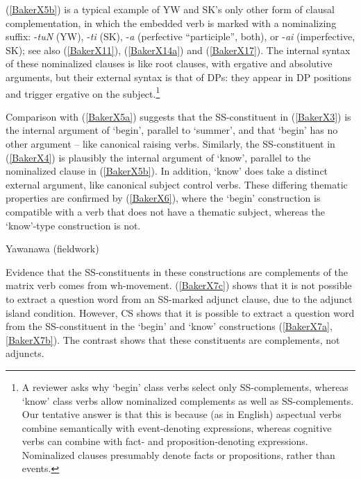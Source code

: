 \documentclass[output=paper]{langscibook}
\begin{document}
(\ref{BakerX5b}) is a typical example of YW and SK’s only other form of clausal complementation, in which the embedded verb is marked with a nominalizing suffix: -\textit{tuN} (YW), -\textit{ti} (SK), -\textit{a} (perfective “participle”, both), or -\textit{ai} (imperfective, SK); see also (\ref{BakerX11}), (\ref{BakerX14a}) and (\ref{BakerX17}). The internal syntax of these nominalized clauses is like root clauses, with ergative and absolutive arguments, but their external syntax is that of DPs: they appear in DP positions and trigger ergative on the subject.\footnote{A reviewer asks why `begin’ class verbs select only SS-complements, whereas `know’ class verbs allow nominalized complements as well as SS-complements. Our tentative answer is that this is because (as in English) aspectual verbs combine semantically with event-denoting expressions, whereas cognitive verbs can combine with fact- and proposition-denoting expressions. Nominalized clauses presumably denote facts or propositions, rather than events.}

Comparison with (\ref{BakerX5a}) suggests that the SS-constituent in (\ref{BakerX3}) is the internal argument of `begin’, parallel to `summer’, and that `begin’ has no other argument – like canonical raising verbs. Similarly, the SS-constituent in (\ref{BakerX4}) is plausibly the internal argument of `know’, parallel to the nominalized clause in (\ref{BakerX5b}). In addition, `know’ does take a distinct external argument, like canonical subject control verbs. These differing thematic properties are confirmed by (\ref{BakerX6}), where the `begin’ construction is compatible with a verb that does not have a thematic subject, whereas the `know’-type construction is not.

\begin{exe}\judgewidth{\#}
    \ex Yawanawa (fieldwork) \label{BakerX6}
        \begin{xlist}
        \end{xlist}
\end{exe}

Evidence that the SS-constituents in these constructions are complements of the matrix verb comes from wh-movement. (\ref{BakerX7c}) shows that it is not possible to extract a question word from an SS-marked adjunct clause, due to the adjunct island condition. However, CS shows that it is possible to extract a question word from the SS-constituent in the ‘begin’ and ‘know’ constructions (\ref{BakerX7a}, \ref{BakerX7b}). The contrast shows that these constituents are complements, not adjuncts.
\end{document}
